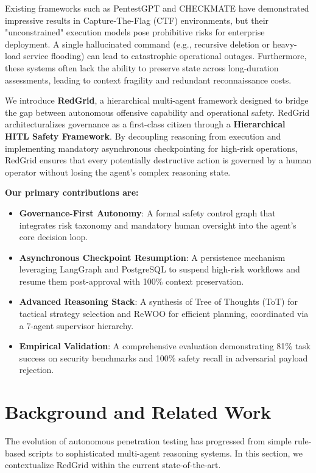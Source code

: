 \documentclass[conference]{IEEEtran}
\begin{document}
Existing frameworks such as PentestGPT \cite{pentestgpt} and CHECKMATE \cite{checkmate2025} have demonstrated impressive results in Capture-The-Flag (CTF) environments, but their "unconstrained" execution models pose prohibitive risks for enterprise deployment. A single hallucinated command (e.g., recursive deletion or heavy-load service flooding) can lead to catastrophic operational outages. Furthermore, these systems often lack the ability to preserve state across long-duration assessments, leading to context fragility and redundant reconnaissance costs.

We introduce \textbf{RedGrid}, a hierarchical multi-agent framework designed to bridge the gap between autonomous offensive capability and operational safety. RedGrid architecturalizes governance as a first-class citizen through a \textbf{Hierarchical HITL Safety Framework}. By decoupling reasoning from execution and implementing mandatory asynchronous checkpointing for high-risk operations, RedGrid ensures that every potentially destructive action is governed by a human operator without losing the agent's complex reasoning state.

\textbf{Our primary contributions are:}
\begin{itemize}
    \item \textbf{Governance-First Autonomy}: A formal safety control graph that integrates risk taxonomy and mandatory human oversight into the agent's core decision loop.
    \item \textbf{Asynchronous Checkpoint Resumption}: A persistence mechanism leveraging LangGraph and PostgreSQL to suspend high-risk workflows and resume them post-approval with 100\% context preservation.
    \item \textbf{Advanced Reasoning Stack}: A synthesis of Tree of Thoughts (ToT) for tactical strategy selection and ReWOO for efficient planning, coordinated via a 7-agent supervisor hierarchy.
    \item \textbf{Empirical Validation}: A comprehensive evaluation demonstrating 81\% task success on security benchmarks and 100\% safety recall in adversarial payload rejection.
\end{itemize}

\section{Background and Related Work}
\label{sec:background}

The evolution of autonomous penetration testing has progressed from simple rule-based scripts to sophisticated multi-agent reasoning systems. In this section, we contextualize RedGrid within the current state-of-the-art.
\end{document}
